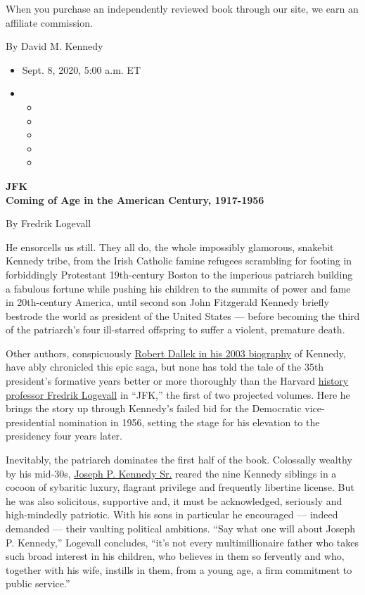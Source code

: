 When you purchase an independently reviewed book through our site, we
earn an affiliate commission.

By David M. Kennedy

\begin{itemize}
\item
  Sept. 8, 2020, 5:00 a.m. ET
\item
  \begin{itemize}
  \item
  \item
  \item
  \item
  \item
  \end{itemize}
\end{itemize}

\textbf{JFK}\\
\textbf{Coming of Age in the American Century, 1917-1956}

By Fredrik Logevall

He ensorcells us still. They all do, the whole impossibly glamorous,
snakebit Kennedy tribe, from the Irish Catholic famine refugees
scrambling for footing in forbiddingly Protestant 19th-century Boston to
the imperious patriarch building a fabulous fortune while pushing his
children to the summits of power and fame in 20th-century America, until
second son John Fitzgerald Kennedy briefly bestrode the world as
president of the United States --- before becoming the third of the
patriarch's four ill-starred offspring to suffer a violent, premature
death.

Other authors, conspicuously
\href{https://www.nytimes3xbfgragh.onion/2003/05/28/books/books-of-the-times-substance-over-sex-in-kennedy-biography.html}{Robert
Dallek in his 2003 biography} of Kennedy, have ably chronicled this epic
saga, but none has told the tale of the 35th president's formative years
better or more thoroughly than the Harvard
\href{https://history.fas.harvard.edu/people/fredrik-logevall}{history
professor Fredrik Logevall} in ``JFK,'' the first of two projected
volumes. Here he brings the story up through Kennedy's failed bid for
the Democratic vice-presidential nomination in 1956, setting the stage
for his elevation to the presidency four years later.

Inevitably, the patriarch dominates the first half of the book.
Colossally wealthy by his mid-30s,
\href{https://www.nytimes3xbfgragh.onion/2012/11/30/books/david-nasaws-patriarch-on-joseph-p-kennedy.html}{Joseph
P. Kennedy Sr.} reared the nine Kennedy siblings in a cocoon of
sybaritic luxury, flagrant privilege and frequently libertine license.
But he was also solicitous, supportive and, it must be acknowledged,
seriously and high-mindedly patriotic. With his sons in particular he
encouraged --- indeed demanded --- their vaulting political ambitions.
``Say what one will about Joseph P. Kennedy,'' Logevall concludes,
``it's not every multimillionaire father who takes such broad interest
in his children, who believes in them so fervently and who, together
with his wife, instills in them, from a young age, a firm commitment to
public service.''

